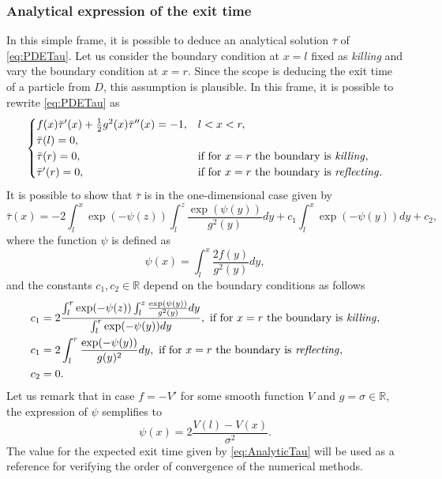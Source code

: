 \subsubsection{Analytical expression of the exit time}
In this simple frame, it is possible to deduce an analytical solution $\bar\tau$ of \eqref{eq:PDETau}. Let us consider the boundary condition at $x=l$ fixed as \textit{killing} and vary the boundary condition at $x=r$. Since the scope is deducing the exit time of a particle from $D$, this assumption is plausible. In this frame, it is possible to rewrite \eqref{eq:PDETau} as
\begin{equation}\label{eq:ODETau}
\begin{cases}
	f(x)\bar\tau'(x) + \frac{1}{2} g^2(x) \bar\tau''(x) = -1, & l < x < r, \\
	\bar\tau(l) = 0, \\
	\bar\tau(r) = 0, & \text{if for $x = r$ the boundary is \textit{killing}}, \\
	\bar\tau'(r) = 0, & \text{if for $x = r$ the boundary is \textit{reflecting}}. 
\end{cases}
\end{equation}
It is possible to show \cite{Krumscheid2015,Pavliotis2014} that $\bar\tau$ is in the one-dimensional case given by
\begin{equation}\label{eq:AnalyticTau}
	\bar\tau(x) = -2 \int_l^x \exp(-\psi(z)) \int_l^z \frac{\exp(\psi(y))}{g^2(y)}dy + c_1 \int_l^x \exp(-\psi(y))dy + c_2,
\end{equation}
where the function $\psi$ is defined as
\begin{equation}\label{eq:psi}
	\psi(x) = \int_l^x \frac{2f(y)}{g^2(y)}dy,
\end{equation}
and the constants $c_1,c_2 \in \mathbb{R}$ depend on the boundary conditions as follows
\begin{align}\label{eq:Constants}
\begin{split}
	c_1 &= 2\frac{\int_l^r \exp(-\psi(z)) \int_l^z \frac{\exp(\psi(y))}{g^2(y)}dy}{\int_l^r \exp(-\psi(y))dy}, \text{  if for $x = r$ the boundary is \textit{killing}}, \\
	c_1 &= 2\int_l^r \frac{\exp(-\psi(y))}{g(y)^2}dy, \text{  if for $x = r$ the boundary is \textit{reflecting}}, \\
	c_2 &= 0.
\end{split}
\end{align}
Let us remark that in case $f = -V'$ for some smooth function $V$ and $g = \sigma \in \mathbb{R}$, the expression of $\psi$ semplifies to
\begin{equation}\label{eq:psiSemplified}
	\psi(x) = 2\frac{V(l)-V(x)}{\sigma^2}.
\end{equation}
The value for the expected exit time given by \eqref{eq:AnalyticTau} will be used as a reference for verifying the order of convergence of the numerical methods.
